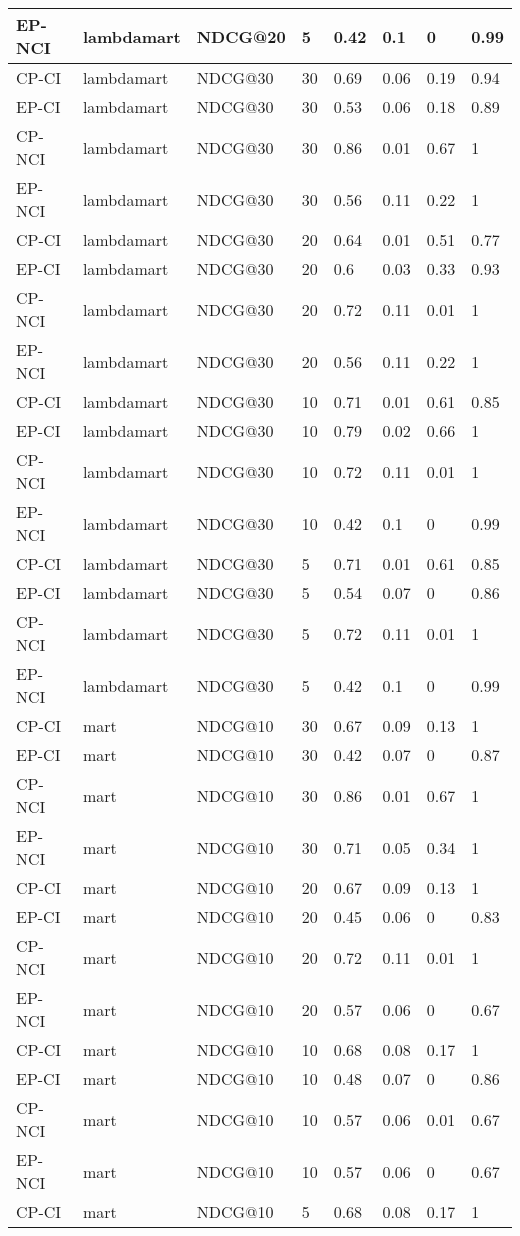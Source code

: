 \begin{landscape}
\begin{longtable}{|*{8}{l|}}
EP-NCI&lambdamart&NDCG@20&5&0.42&0.1&0&0.99\\
\hline
CP-CI&lambdamart&NDCG@30&30&0.69&0.06&0.19&0.94\\
EP-CI&lambdamart&NDCG@30&30&0.53&0.06&0.18&0.89\\
CP-NCI&lambdamart&NDCG@30&30&0.86&0.01&0.67&1\\
EP-NCI&lambdamart&NDCG@30&30&0.56&0.11&0.22&1\\
\hline
CP-CI&lambdamart&NDCG@30&20&0.64&0.01&0.51&0.77\\
EP-CI&lambdamart&NDCG@30&20&0.6&0.03&0.33&0.93\\
CP-NCI&lambdamart&NDCG@30&20&0.72&0.11&0.01&1\\
EP-NCI&lambdamart&NDCG@30&20&0.56&0.11&0.22&1\\
\hline
CP-CI&lambdamart&NDCG@30&10&0.71&0.01&0.61&0.85\\
EP-CI&lambdamart&NDCG@30&10&0.79&0.02&0.66&1\\
CP-NCI&lambdamart&NDCG@30&10&0.72&0.11&0.01&1\\
EP-NCI&lambdamart&NDCG@30&10&0.42&0.1&0&0.99\\
\hline
CP-CI&lambdamart&NDCG@30&5&0.71&0.01&0.61&0.85\\
EP-CI&lambdamart&NDCG@30&5&0.54&0.07&0&0.86\\
CP-NCI&lambdamart&NDCG@30&5&0.72&0.11&0.01&1\\
EP-NCI&lambdamart&NDCG@30&5&0.42&0.1&0&0.99\\
\hline
CP-CI&mart&NDCG@10&30&0.67&0.09&0.13&1\\
EP-CI&mart&NDCG@10&30&0.42&0.07&0&0.87\\
CP-NCI&mart&NDCG@10&30&0.86&0.01&0.67&1\\
EP-NCI&mart&NDCG@10&30&0.71&0.05&0.34&1\\
\hline
CP-CI&mart&NDCG@10&20&0.67&0.09&0.13&1\\
EP-CI&mart&NDCG@10&20&0.45&0.06&0&0.83\\
CP-NCI&mart&NDCG@10&20&0.72&0.11&0.01&1\\
EP-NCI&mart&NDCG@10&20&0.57&0.06&0&0.67\\
\hline
CP-CI&mart&NDCG@10&10&0.68&0.08&0.17&1\\
EP-CI&mart&NDCG@10&10&0.48&0.07&0&0.86\\
CP-NCI&mart&NDCG@10&10&0.57&0.06&0.01&0.67\\
EP-NCI&mart&NDCG@10&10&0.57&0.06&0&0.67\\
\hline
CP-CI&mart&NDCG@10&5&0.68&0.08&0.17&1\\

\end{longtable}
\end{landscape}
